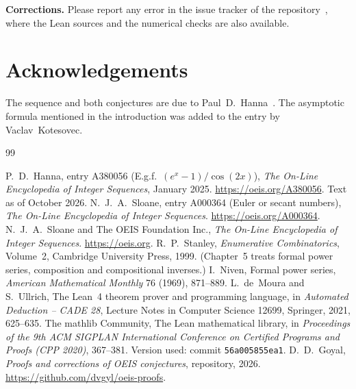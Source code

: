 \documentclass[11pt,a4paper]{article}
\theoremstyle{definition}
\theoremstyle{remark}
\newcommand{\para}[1]{\par\medskip\noindent\textbf{#1}\enspace}
\begin{document}
\para{Corrections.} Please report any error in the issue tracker of the repository~\cite{repo}, where the Lean sources and the numerical checks are also
available.

\section*{Acknowledgements}
The sequence and both conjectures are due to Paul~D.~Hanna~\cite{oeis}. The asymptotic formula mentioned in the
introduction was added to the entry by Vaclav~Kotesovec.

\begin{thebibliography}{99}\small
\raggedright
{} P.~D.~Hanna, entry A380056 (E.g.f.\ $(e^x-1)/\cos(2x)$), \emph{The On-Line Encyclopedia of Integer Sequences}, January 2025. \url{https://oeis.org/A380056}. Text as of October 2026.
 N.~J.~A.~Sloane, entry A000364 (Euler or secant numbers), \emph{The On-Line Encyclopedia of Integer Sequences}. \url{https://oeis.org/A000364}.
 N.~J.~A.~Sloane and The OEIS Foundation Inc., \emph{The On-Line Encyclopedia of Integer Sequences}. \url{https://oeis.org}.
 R.~P.~Stanley, \emph{Enumerative Combinatorics}, Volume~2, Cambridge University Press, 1999. (Chapter~5 treats formal power series, composition and compositional inverses.)
 I.~Niven, Formal power series, \emph{American Mathematical Monthly} 76 (1969), 871--889.
 L.~de~Moura and S.~Ullrich, The Lean~4 theorem prover and programming language, in \emph{Automated Deduction -- CADE 28}, Lecture Notes in Computer Science 12699, Springer, 2021, 625--635.
 The mathlib Community, The Lean mathematical library, in \emph{Proceedings of the 9th ACM SIGPLAN International Conference on Certified Programs and Proofs (CPP 2020)}, 367--381. Version used: commit \texttt{56a005855ea1}.
 D.~D.~Goyal, \emph{Proofs and corrections of OEIS conjectures}, repository, 2026. \url{https://github.com/dvgyl/oeis-proofs}.
\end{thebibliography}
\end{document}
